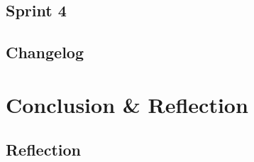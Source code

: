 \documentclass[12pt]{report}
\begin{document}
	

	

	

\chapter{Sprint 4}

	

\chapter{Changelog}

\part{Conclusion \& Reflection}

\chapter{Reflection}

\printglossaries
{}
\end{document}
